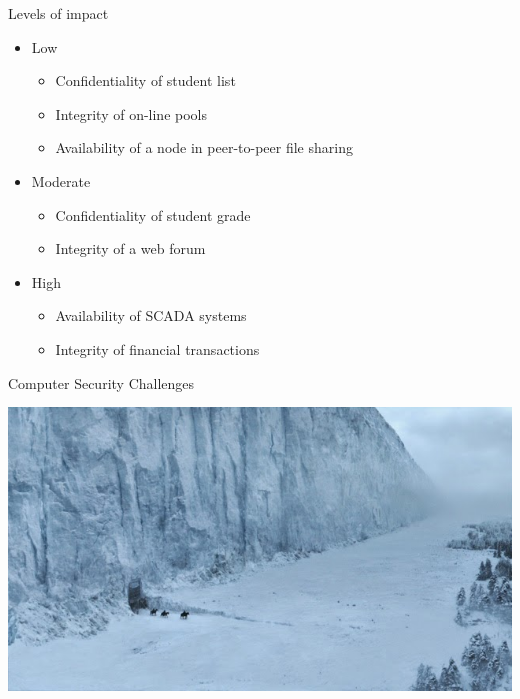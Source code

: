 \documentclass{beamer}
\begin{document}
\begin{frame}{Levels of impact}
  \begin{itemize}
  \item Low
    \begin{itemize}
      \item Confidentiality of student list
      \item Integrity of on-line pools
      \item Availability of a node in peer-to-peer file sharing
    \end{itemize}
  \item Moderate    
    \begin{itemize}
      \item Confidentiality of student grade
      \item Integrity of a web forum
    \end{itemize}
  \item High
    \begin{itemize}
      \item Availability of SCADA systems
      \item Integrity of financial transactions
    \end{itemize}
  \end{itemize}
\end{frame}

 
\begin{frame}{Computer Security Challenges}
\begin{center}
  \includegraphics[width=0.9\linewidth]{thewall1}
\end{center}
\end{frame}
\end{document}
